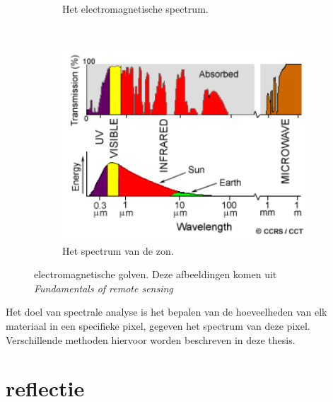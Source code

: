 \documentclass[12pt]{report}
\newcommand{\rulesep}{\unskip\ \vrule height -1ex\ }
\begin{document}
\begin{figure}
\begin{subfigure}[b]{0.2\textwidth}
\caption{Het electromagnetische spectrum. \label{fig:spec}}
\end{subfigure}\rulesep
\begin{subfigure}[b]{0.4\textwidth}
\includegraphics[width=\textwidth]{spec2.PNG}
\caption{Het spectrum van de zon. \label{fig:specs}}
\end{subfigure}
\caption{electromagnetische golven. Deze afbeeldingen komen uit \textit{Fundamentals of remote sensing\cite{fun}}}
\end{figure}


Het doel van spectrale analyse is het bepalen van de hoeveelheden van elk materiaal in een specifieke pixel, gegeven het spectrum van deze pixel. Verschillende methoden hiervoor worden beschreven in deze thesis. 

\section{reflectie} \label{sec:ref}

\end{document}
